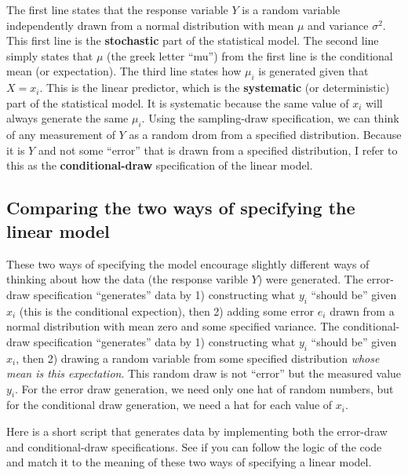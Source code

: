 \documentclass[]{book}
\begin{document}
The first line states that the response variable \(Y\) is a random variable independently drawn from a normal distribution with mean \(\mu\) and variance \(\sigma^2\). This first line is the \textbf{stochastic} part of the statistical model. The second line simply states that \(\mu\) (the greek letter ``mu'') from the first line is the conditional mean (or expectation). The third line states how \(\mu_i\) is generated given that \(X=x_i\). This is the linear predictor, which is the \textbf{systematic} (or deterministic) part of the statistical model. It is systematic because the same value of \(x_i\) will always generate the same \(\mu_i\). Using the sampling-draw specification, we can think of any measurement of \(Y\) as a random drom from a specified distribution. Because it is \(Y\) and not some ``error'' that is drawn from a specified distribution, I refer to this as the \textbf{conditional-draw} specification of the linear model.

\hypertarget{comparing-the-two-ways-of-specifying-the-linear-model}{%
\subsection{Comparing the two ways of specifying the linear model}\label{comparing-the-two-ways-of-specifying-the-linear-model}}

These two ways of specifying the model encourage slightly different ways of thinking about how the data (the response varible \(Y\)) were generated. The error-draw specification ``generates'' data by 1) constructing what \(y_i\) ``should be'' given \(x_i\) (this is the conditional expection), then 2) adding some error \(e_i\) drawn from a normal distribution with mean zero and some specified variance. The conditional-draw specification ``generates'' data by 1) constructing what \(y_i\) ``should be'' given \(x_i\), then 2) drawing a random variable from some specified distribution \emph{whose mean is this expectation}. This random draw is not ``error'' but the measured value \(y_i\). For the error draw generation, we need only one hat of random numbers, but for the conditional draw generation, we need a hat for each value of \(x_i\).

Here is a short script that generates data by implementing both the error-draw and conditional-draw specifications. See if you can follow the logic of the code and match it to the meaning of these two ways of specifying a linear model.
\end{document}
